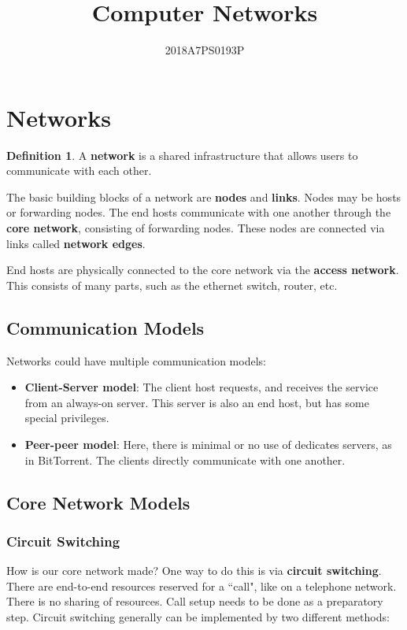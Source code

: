 \documentclass[12pt,letterpaper]{article}
\title{Computer Networks}
\author{2018A7PS0193P}
\theoremstyle{definition}
\newtheorem{definition}{Definition}[section] %
\begin{document}
\maketitle

\section{Networks}

\begin{definition}
  A \textbf{network} is a shared infrastructure that allows users to communicate with each other.
\end{definition}

The basic building blocks of a network are \textbf{nodes} and \textbf{links}. Nodes may be hosts or forwarding nodes. The end hosts communicate with one another through the \textbf{core network}, consisting of forwarding nodes. These nodes are connected via links called \textbf{network edges}.

End hosts are physically connected to the core network via the \textbf{access network}. This consists of many parts, such as the ethernet switch, router, etc.

\subsection{Communication Models}

Networks could have multiple communication models:

\begin{itemize}
  \item \textbf{Client-Server model}: The client host requests, and receives the service from an always-on server. This server is also an end host, but has some special privileges.
  \item \textbf{Peer-peer model}: Here, there is minimal or no use of dedicates servers, as in BitTorrent. The clients directly communicate with one another.
\end{itemize}

\subsection{Core Network Models}

\subsubsection{Circuit Switching}

How is our core network made? One way to do this is via \textbf{circuit switching}. There are end-to-end resources reserved for a ``call", like on a telephone network. There is no sharing of resources. Call setup needs to be done as a preparatory step. Circuit switching generally can be implemented by two different methods:
\end{document}
